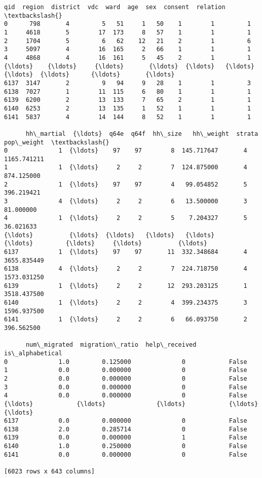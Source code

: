 \documentclass[11pt]{article}
\makeatletter
\newcommand{\boxspacing}{\kern\kvtcb@left@rule\kern\kvtcb@boxsep}
\newcommand{\prompt}[4]{
        {\ttfamily\llap{{\color{#2}[#3]:\hspace{3pt}#4}}\vspace{-\baselineskip}}
    }
\makeatother
\begin{document}
            \begin{tcolorbox}[breakable, size=fbox, boxrule=.5pt, pad at break*=1mm, opacityfill=0]
\prompt{Out}{outcolor}{79}{\boxspacing}
\begin{Verbatim}[commandchars=\\\{\}]
       qid  region  district  vdc  ward  age  sex  consent  relation  \textbackslash{}
0      798       4         5   51     1   50    1        1         1
1     4618       5        17  173     8   57    1        1         1
2     1704       5         6   62    12   21    2        1         6
3     5097       4        16  165     2   66    1        1         1
4     4868       4        16  161     5   45    2        1         1
{\ldots}    {\ldots}     {\ldots}       {\ldots}  {\ldots}   {\ldots}  {\ldots}  {\ldots}      {\ldots}       {\ldots}
6137  3147       2         9   94     9   28    1        1         3
6138  7027       1        11  115     6   80    1        1         1
6139  6200       2        13  133     7   65    2        1         1
6140  6253       2        13  135     1   52    1        1         1
6141  5837       4        14  144     8   52    1        1         1

      hh\_martial  {\ldots}  q64e  q64f  hh\_size   hh\_weight  strata   pop\_weight  \textbackslash{}
0              1  {\ldots}    97    97        8  145.717647       4  1165.741211
1              1  {\ldots}     2     2        7  124.875000       4   874.125000
2              1  {\ldots}    97    97        4   99.054852       5   396.219421
3              4  {\ldots}     2     2        6   13.500000       3    81.000000
4              1  {\ldots}     2     2        5    7.204327       5    36.021633
{\ldots}          {\ldots}  {\ldots}   {\ldots}   {\ldots}      {\ldots}         {\ldots}     {\ldots}          {\ldots}
6137           1  {\ldots}    97    97       11  332.348684       4  3655.835449
6138           4  {\ldots}     2     2        7  224.718750       4  1573.031250
6139           1  {\ldots}     2     2       12  293.203125       1  3518.437500
6140           1  {\ldots}     2     2        4  399.234375       3  1596.937500
6141           1  {\ldots}     2     2        6   66.093750       2   396.562500

      num\_migrated  migration\_ratio  help\_received  is\_alphabetical
0              1.0         0.125000              0            False
1              0.0         0.000000              0            False
2              0.0         0.000000              0            False
3              0.0         0.000000              0            False
4              0.0         0.000000              0            False
{\ldots}            {\ldots}              {\ldots}            {\ldots}              {\ldots}
6137           0.0         0.000000              0            False
6138           2.0         0.285714              0            False
6139           0.0         0.000000              1            False
6140           1.0         0.250000              0            False
6141           0.0         0.000000              0            False

[6023 rows x 643 columns]
\end{Verbatim}
\end{tcolorbox}
        
\end{document}

